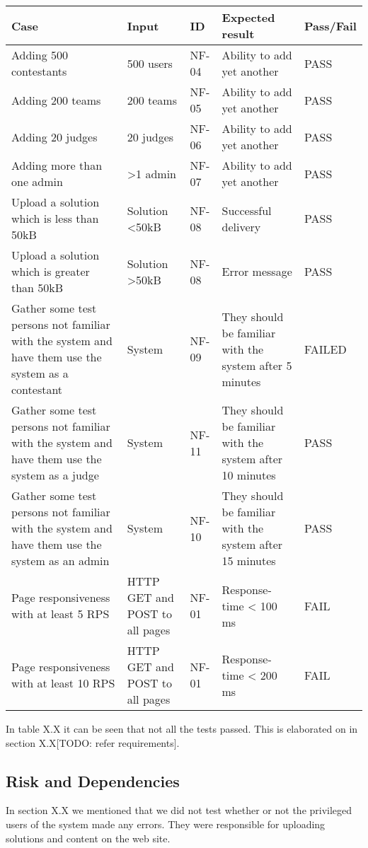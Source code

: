 \begin{tabular}{|m{1.7650598in}|m{0.95255977in}|m{0.6608598in}|m{1.9212599in}|m{0.8066598in}|}
\hline
Case &
Input &
ID &
Expected result &
Pass/Fail\\\hline
Adding 500 contestants &
500 users &
NF-04 &
Ability to add yet another &
PASS\\\hline
Adding 200 teams &
200 teams &
NF-05 &
Ability to add yet another &
PASS\\\hline
Adding 20 judges &
20 judges &
NF-06 &
Ability to add yet another &
PASS\\\hline
Adding more than one admin &
{\textgreater}1 admin &
NF-07 &
Ability to add yet another &
PASS\\\hline
Upload a solution which is less than 50kB &
Solution {\textless}50kB &
NF-08 &
Successful delivery &
PASS\\\hline
Upload a solution which is greater than 50kB &
Solution {\textgreater}50kB &
NF-08 &
Error message &
PASS\\\hline
Gather some test persons not familiar with the
system and have them use the system as a contestant &
System &
NF-09 &
They should be familiar with the system after 5
minutes &
FAILED\\\hline
Gather some test persons not familiar with the
system and have them use the system as a judge &
System &
NF-11 &
They should be familiar with the system after 10
minutes &
PASS\\\hline
Gather some test persons not familiar with the
system and have them use the system as an admin &
System &
NF-10 &
They should be familiar with the system after 15 minutes &
PASS\\\hline
Page responsiveness with at least 5 RPS &
HTTP GET and POST to all pages &
NF-01 &
Response-time {\textless} 100 ms &
FAIL\\\hline
Page responsiveness with at least 10 RPS &
HTTP GET and POST to all pages &
NF-01 &
Response-time {\textless} 200 ms &
FAIL\\
\hline
\end{tabular}


In table X.X it can be seen that not all the tests passed. This is
elaborated on in section X.X[TODO: refer requirements].
\subsection{Risk and Dependencies}
In section X.X we mentioned that we did not test whether or not the
privileged users of the system made any errors. They were responsible
for uploading solutions and content on the web site.

